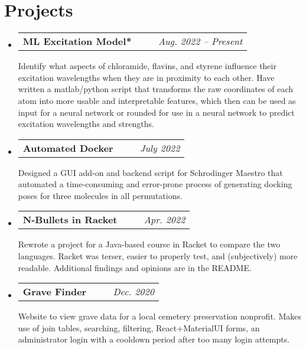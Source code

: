 \documentclass[letterpaper,11pt]{article}
\makeatletter
\newcommand{\resumeSubheading}[5]{
  \vspace{-1pt}\item
    \begin{tabular*}{0.97\textwidth}[t]{c@{\extracolsep{\fill}} r }
      \small\textbf{#1} \headingcap{#3} \ \ \ #2 &  \raggedleft\textit{\small #4} 
    \end{tabular*}
    \small#5
}
\newcommand{\resumeSubHeadingListStart}{\begin{itemize}[leftmargin=*]}
\newcommand{\resumeSubHeadingListEnd}{\end{itemize}}
\makeatother
\begin{document}
  \section{Projects\small{}}
  \resumeSubHeadingListStart
  \resumeSubheading{ML Excitation Model*}{}{Python, Maestro, MATLAB, Bash, TensorFlow}{Aug. 2022 -- Present}{Identify what aspects of chloramide, flavins, and styrene influence their excitation wavelengths when they are in proximity to each other. Have written a matlab/python script that transforms the raw coordinates of each atom into more usable and interpretable features, which then can be used as input for a neural network or rounded for use in a neural network to predict excitation wavelengths and strengths. }
  \resumeSubheading{Automated Docker}{\ghlink{automated\_docking\_script}}{Python, Maestro, Slurm, QtPy}{July 2022}{Designed a GUI add-on and backend script for Schrodinger Maestro that automated a time-consuming and error-prone process of generating docking poses for three molecules in all permutations.}
  \resumeSubheading{N-Bullets in Racket}{\ghlink{nbulletsrkt}}{Racket}{Apr. 2022}
  {Rewrote a project for a Java-based course in Racket to compare the two languages. Racket was terser, easier to properly test, and (subjectively) more readable. Additional findings and opinions are in the README.}
  \resumeSubheading{Grave Finder}{\ghlink{findagravemiddleborough.ml}}{ReactJS, PHP, MySQL, Cloudflare, cPanel, SSL}{Dec. 2020}{Website to view grave data for a local cemetery preservation nonprofit. Makes use of join tables, searching, filtering, React+MaterialUI forms, an administrator login with a cooldown period after too many login attempts. }
  \resumeSubHeadingListEnd
\end{document}
